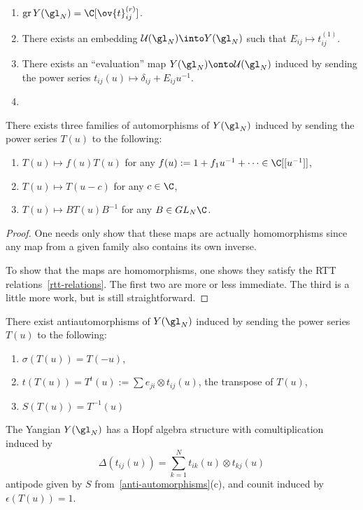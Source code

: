 \documentclass[11pt,leqno,oneside]{amsbook}
\numberwithin{thm}{section}
\newcommand{\U}{\mathcal{U}}
\newcommand{\associatedGraded}{\operatorname{gr}}
\begin{document}
\begin{cor}
  \begin{enumerate}
  \item \(\associatedGraded Y(\gl_N) = \C[\ov{t}_{ij}^{(r)}]\).
  \item There exists an embedding \(\U(\gl_N) \into Y(\gl_N)\) such
    that \(E_{ij} \mapsto t_{ij}^{(1)}\).
  \item There exists an ``evaluation'' map \(Y(\gl_N) \onto
    \U(\gl_N)\) induced by sending the power series \(t_{ij}(u)
    \mapsto \delta_{ij}+E_{ij}u^{-1}\).
  \item 
  \end{enumerate}
\end{cor}
\begin{prop}\label{anti-automorphisms}
  There exists three families of automorphisms of \(Y(\gl_N)\) induced
  by sending the power series 
    \(T(u)\) to the following:
    \begin{enumerate}
    \item \(T(u) \mapsto f(u)T(u)\) for any \(f(u) :=
      1+f_1u^{-1}+\cdots \in \C[[u^{-1}]]\),
    \item \(T(u) \mapsto T(u-c)\) for any \(c \in \C\),
    \item \(T(u) \mapsto BT(u)B^{-1}\) for any \(B \in GL_N\C\).
    \end{enumerate}
\end{prop}
\begin{proof}
  One needs only show that these maps are actually homomorphisms since
  any map from a given family also contains its own inverse.

  To show that the maps are homomorphisms, one shows they satisfy the
  RTT relations~\ref{rtt-relations}. The first two are more or less
  immediate. The third is a little more work, but is still straightforward.
\end{proof}
\begin{prop}
  There exist antiautomorphisms of \(Y(\gl_N)\) induced by sending the power series
  \(T(u)\) to the following:
  \begin{enumerate}
  \item \(\sigma(T(u)) = T(-u)\),
  \item \(t(T(u)) = T^t(u) := \sum e_{ji} \otimes t_{ij}(u)\), the
    transpose of \(T(u)\),
  \item \(S(T(u)) = T^{-1}(u)\)
  \end{enumerate}
\end{prop}
\begin{thm}
  The Yangian \(Y(\gl_N)\) has a Hopf algebra structure with
  comultiplication induced by \[
    \Delta(t_{ij}(u)) = \sum_{k=1}^N t_{ik}(u) \otimes t_{kj}(u)
  \]
  antipode given by \(S\) from~\ref{anti-automorphisms}(c), and counit
  induced by \(\epsilon(T(u)) = 1\).
\end{thm}
\end{document}
